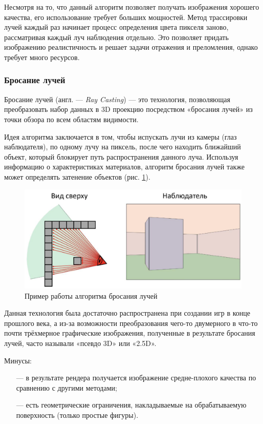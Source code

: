 Несмотря на то, что данный алгоритм позволяет получать изображения 
хорошего качества, его использование требует больших мощностей.
Метод 
трассировки лучей каждый раз начинает процесс определения цвета пикселя 
заново, рассматривая каждый луч наблюдения отдельно.
Это позволяет придать 
изображению реалистичность и решает задачи отражения и преломления, 
однако требует много ресурсов.

\subsubsection{Бросание лучей}

Бросание лучей (англ. --- \textit{Ray Casting}) \cite{raycasting} --- это технология, позволяющая 
преобразовать набор данных в 3D проекцию посредством «бросания лучей» из 
точки обзора по всем областям видимости.

Идея алгоритма заключается в том, чтобы испускать лучи из камеры (глаз 
наблюдателя), по одному лучу на пиксель, после чего находить ближайший 
объект, который блокирует путь распространения данного луча.
Используя информацию о характеристиках материалов, алгоритм бросания лучей также может определять затенение объектов (рис. \ref{fig:raycasting}).

\begin{figure}[h]
	\centering
	\captionsetup{justification=centering}
	\includegraphics[width=120mm]{img/raycasting.png}
	\caption{Пример работы алгоритма бросания лучей}
	\label{fig:raycasting}
\end{figure}

Данная технология была достаточно распространена при создании игр в 
конце прошлого века, а из-за возможности преобразования чего-то двумерного 
в что-то почти трёхмерное графические изображения, полученные в результате 
бросания лучей, часто называли «псевдо 3D» или «2.5D».

Минусы:
\begin{itemize}[leftmargin=1.6\parindent]
	\item[---] в результате рендера получается изображение средне-плохого качества по сравнению с другими методами;
	\item[---] есть геометрические ограничения, накладываемые на обрабатываемую поверхность (только простые фигуры).
\end{itemize}

